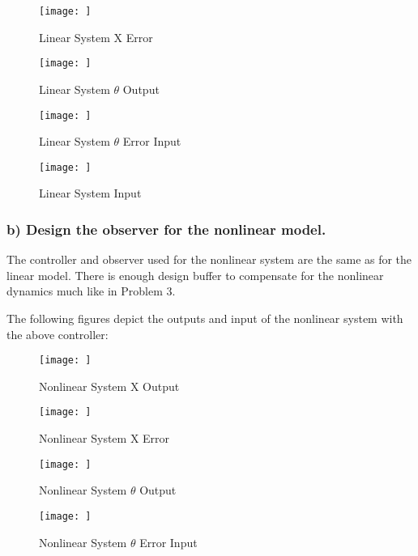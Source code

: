 \begin{figure}[!ht]
    \centering
    \texttt{[image: ]}
    \caption{Linear System X Error}
    \label{}
\end{figure}

\begin{figure}[!ht]
    \centering
    \texttt{[image: ]}
    \caption{Linear System $\theta$ Output}
    \label{}
\end{figure}

\begin{figure}[!ht]
    \centering
    \texttt{[image: ]}
    \caption{Linear System $\theta$ Error Input}
    \label{}
\end{figure}


\begin{figure}[!ht]
    \centering
    \texttt{[image: ]}
    \caption{Linear System Input}
    \label{}
\end{figure}

\clearpage

\subsubsection*{b) Design the observer for the nonlinear model.}

The controller and observer used for the nonlinear system are the same as for the linear model. There is enough design buffer to compensate for the nonlinear dynamics much like in Problem 3.

The following figures depict the outputs and input of the nonlinear system with the above controller:

\begin{figure}[!ht]
    \centering
    \texttt{[image: ]}
    \caption{Nonlinear System X Output}
    \label{}
\end{figure}

\begin{figure}[!ht]
    \centering
    \texttt{[image: ]}
    \caption{Nonlinear System X Error}
    \label{}
\end{figure}

\begin{figure}[!ht]
    \centering
    \texttt{[image: ]}
    \caption{Nonlinear System $\theta$ Output}
    \label{}
\end{figure}

\begin{figure}[!ht]
    \centering
    \texttt{[image: ]}
    \caption{Nonlinear System $\theta$ Error Input}
    \label{}
\end{figure}


